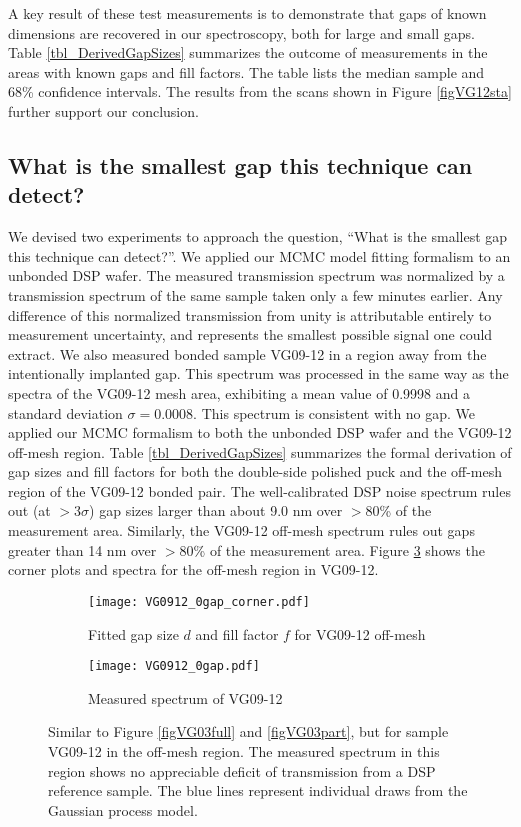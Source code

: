 \documentclass[osajnl,twocolumn,showpacs,superscriptaddress,11pt]{revtex4-1} %
\begin{document}
A key result of these test measurements is to demonstrate that gaps of known dimensions are recovered in our spectroscopy, both for large and small gaps.  Table \ref{tbl_DerivedGapSizes} summarizes the outcome of measurements in the areas with known gaps and fill factors.  The table lists the median sample and 68\% confidence intervals.  The results from the scans shown in Figure \ref{figVG12sta} further support our conclusion.

\subsection{What is the smallest gap this technique can detect?}
We devised two experiments to approach the question, ``What is the smallest gap this technique can detect?''.  We applied our MCMC model fitting formalism to an unbonded DSP wafer.  The measured transmission spectrum was normalized by a transmission spectrum of the same sample taken only a few minutes earlier.  Any difference of this normalized transmission from unity is attributable entirely to measurement uncertainty, and represents the smallest possible signal one could extract.  We also measured bonded sample VG09-12 in a region away from the intentionally implanted gap.  This spectrum was processed in the same way as the spectra of the VG09-12 mesh area, exhibiting a mean value of 0.9998 and a standard deviation $\sigma=0.0008$.  This spectrum is consistent with no gap.  We applied our MCMC formalism to both the unbonded DSP wafer and the VG09-12 off-mesh region.  Table \ref{tbl_DerivedGapSizes} summarizes the formal derivation of gap sizes and fill factors for both the double-side polished puck and the off-mesh region of the VG09-12 bonded pair.  The well-calibrated DSP noise spectrum rules out (at $>3\sigma$) gap sizes larger than about 9.0 nm over $>80$\% of the measurement area.  Similarly, the VG09-12 off-mesh spectrum rules out gaps greater than 14 nm over $>80$\% of the measurement area.  Figure \ref{figVG12} shows the corner plots and spectra for the off-mesh region in VG09-12.

\begin{figure}[!htbp]
    \centering
    \begin{subfigure}[b]{0.5\textwidth}
        \texttt{[image: VG0912\_0gap\_corner.pdf]}
        \caption{Fitted gap size $d$ and fill factor $f$ for VG09-12 off-mesh}
	\label{VG0912_0gap_corner}
    \end{subfigure}
    \begin{subfigure}[b]{0.5\textwidth}
        \texttt{[image: VG0912\_0gap.pdf]}
        \caption{Measured spectrum of VG09-12}
        \label{VG0912_0gap}
    \end{subfigure}
\caption{Similar to Figure \ref{figVG03full} and \ref{figVG03part}, but for sample VG09-12 in the off-mesh region.  The measured spectrum in this region shows no appreciable deficit of transmission from a DSP reference sample.  The blue lines represent individual draws from the Gaussian process model.  
\label{figVG12}}
\end{figure}
\end{document}
